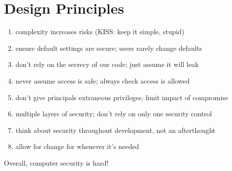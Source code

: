 \section{Design Principles}
\begin{enumerate}
    \item {} complexity increases risks (KISS: keep it simple, stupid)
    \item {} ensure default settings are secure; users rarely change defaults
    \item {} don't rely on the secrecy of our code; just assume it will leak
    \item {} never assume access is safe; always check access is allowed
    \item {} don't give principals extraneous privileges; limit impact of compromise
    \item {} multiple layers of security; don't rely on only one security control
    \item {} think about security throughout development, not an afterthought
    \item {} allow for change for whenever it's needed
\end{enumerate}

Overall, computer security is hard! 


